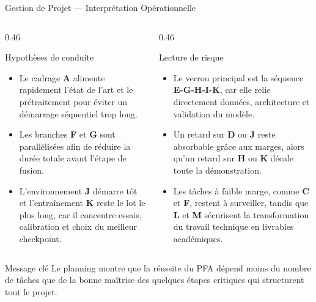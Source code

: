 \begin{frame}{Gestion de Projet --- Interprétation Opérationnelle}
    \scriptsize
    \setlength{\columnsep}{0.8cm}
    \begin{columns}[T,onlytextwidth]
        \begin{column}{0.46\textwidth}
            \begin{block}{Hypothèses de conduite}
                \begin{itemize}
                    \item Le cadrage \textbf{A} alimente rapidement l'état de l'art et le prétraitement pour éviter un démarrage séquentiel trop long.
                    \item Les branches \textbf{F} et \textbf{G} sont parallélisées afin de réduire la durée totale avant l'étape de fusion.
                    \item L'environnement \textbf{J} démarre tôt et l'entraînement \textbf{K} reste le lot le plus long, car il concentre essais, calibration et choix du meilleur checkpoint.
                \end{itemize}
            \end{block}
        \end{column}
        \begin{column}{0.46\textwidth}
            \begin{block}{Lecture de risque}
                \begin{itemize}
                    \item Le verrou principal est la séquence \textbf{E-G-H-I-K}, car elle relie directement données, architecture et validation du modèle.
                    \item Un retard sur \textbf{D} ou \textbf{J} reste absorbable grâce aux marges, alors qu'un retard sur \textbf{H} ou \textbf{K} décale toute la démonstration.
                    \item Les tâches à faible marge, comme \textbf{C} et \textbf{F}, restent à surveiller, tandis que \textbf{L} et \textbf{M} sécurisent la transformation du travail technique en livrables académiques.
                \end{itemize}
            \end{block}
        \end{column}
    \end{columns}

    \vspace{0.16cm}
    \begin{alertblock}{Message clé}
        Le planning montre que la réussite du PFA dépend moins du nombre de tâches que de la bonne maîtrise des quelques étapes critiques qui structurent tout le projet.
    \end{alertblock}
\end{frame}

